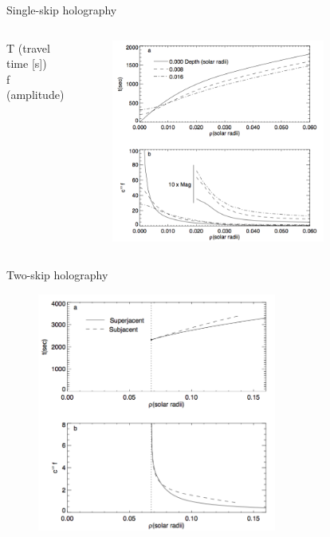 \documentclass{beamer}
\begin{document}
\begin{frame}{Single-skip holography}
\begin{columns}
T (travel time [s])\\
\vspace{1.5in}
f (amplitude)
\column{0.75\paperwidth}
    \begin{figure}
        \includegraphics[width=0.8\textwidth]{fig_8.png}
    \end{figure}
\end{columns}
\end{frame}
\begin{frame}{Two-skip holography}
    \begin{figure}
        \includegraphics[width=0.7\textwidth]{fig_9.png}
    \end{figure}
\end{frame}
\end{document}

